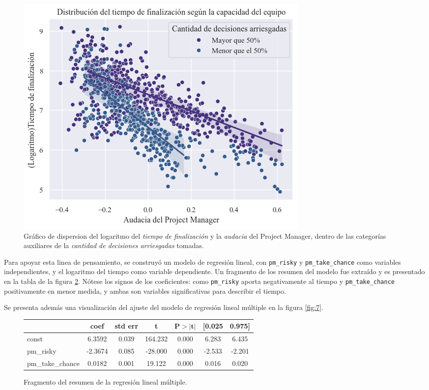 \documentclass[a4paper, 12pt]{article}
\begin{document}
	\begin{figure}[htb!]
		\centering
		\includegraphics[height = .50\linewidth, width=.50\linewidth]{assets/risky_time_scatter}
		\caption{Gráfico de dispersion del logaritmo del  \emph{tiempo de finalización} y la \emph{audacia} del Project Manager, dentro de las categorías auxiliares de la \emph{cantidad de  decisiones arriesgadas} tomadas.}
		\label{fig:6}
	\end{figure}
	
	Para apoyar esta linea de pensamiento, se construyó un modelo de regresión lineal, con \texttt{pm\_risky} y \texttt{pm\_take\_chance} como variables independientes, y el logaritmo del tiempo como variable dependiente. Un fragmento de los resumen del modelo fue extraído y es presentado en la tabla de la figura \ref{table:1}. Nótese los signos de los coeficientes: como \texttt{pm\_risky} aporta negativamente al tiempo y \texttt{pm\_take\_chance} positivamente en menor medida, y ambas son variables significativas para describir el tiempo. 
	
	Se presenta además una visualización del ajuste del modelo de regresión lineal múltiple en la figura \ref{fig:7}.
	
	\begin{figure}[ht!]%
		\begin{center}
			\begin{tabular}{lcccccc}
				\hline
				\multicolumn{1}{c}{\textbf{}} & \multicolumn{1}{c}{\textbf{coef}} & \multicolumn{1}{c}{\textbf{std err}} &\multicolumn{1}{c}{\textbf{t}} &\multicolumn{1}{c}{$\boldsymbol{ P>|t| }$} & \multicolumn{1}{c}{\textbf{[0.025 }} &\multicolumn{1}{c}{\textbf{0.975]}} \\		                                                
				\hline	  		
				const           		    &      6.3592    &   0.039 &   164.232&      0.000&       6.283 &      6.435  \\
				pm\_risky       			  &      -2.3674  &    0.085    &-28.000   &   0.000   &   -2.533    &  -2.201     \\
				pm\_take\_chance	 &     0.0182      &    0.001     &19.122    &  0.000    &   0.016     &  0.020      \\
				\hline
			\end{tabular}
			\caption{Fragmento del resumen de la regresión lineal múltiple.\label{table:1}}
		\end{center}
	\end{figure}
\end{document}
